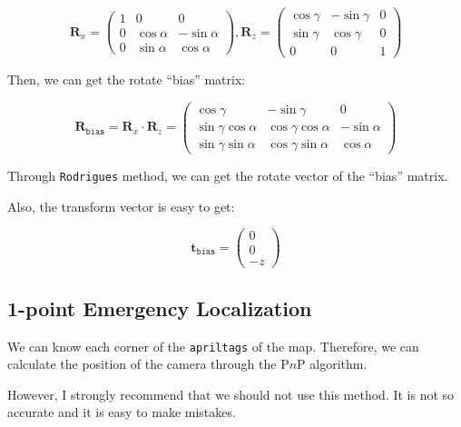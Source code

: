 \documentclass{article}
\begin{document}
\begin{equation}
  \boldsymbol{R}_x=
  \left(
    \begin{matrix}
      1 & 0 & 0 \\
      0 & \cos\alpha & -\sin\alpha \\
      0 & \sin\alpha & \cos\alpha
    \end{matrix}
  \right),
  \boldsymbol{R}_z=
  \left(
    \begin{matrix}
      \cos\gamma & -\sin\gamma & 0 \\
      \sin\gamma & \cos\gamma & 0 \\
      0 & 0 & 1
    \end{matrix}
  \right)
\end{equation}

Then, we can get the rotate ``bias'' matrix:

\begin{equation}
  \boldsymbol{R}_{\texttt{bias}}=\boldsymbol{R}_x\cdot \boldsymbol{R}_z= \left(
    \begin{matrix}
      \cos\gamma & -\sin\gamma & 0 \\
      \sin\gamma\cos\alpha & \cos\gamma\cos\alpha & -\sin\alpha \\
      \sin\gamma\sin\alpha & \cos\gamma\sin\alpha & \cos\alpha
    \end{matrix}
  \right)
\end{equation}

Through \texttt{Rodrigues} method, we can get the rotate vector of the ``bias'' matrix.

Also, the transform vector is easy to get:

\begin{equation}
  \boldsymbol{t}_{\texttt{bias}}=\left(
    \begin{matrix}
      0 \\
      0 \\
      -z
    \end{matrix}
  \right)
\end{equation}

\subsection{1-point Emergency Localization}
We can know each corner of the \texttt{apriltags} of the map. Therefore, we can calculate the position of the camera through the P$n$P algorithm.

However, I strongly recommend that we should not use this method. It is not so accurate and it is easy to make mistakes.
\end{document}
